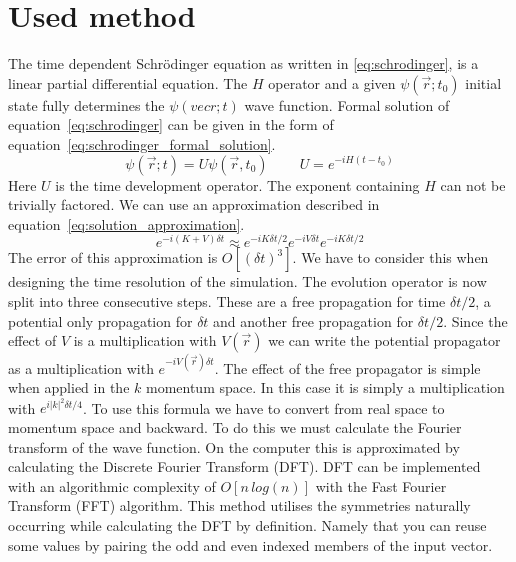 \section{Used method}
\label{sec:used_method}

The time dependent Schrödinger equation as written in \ref{eq:schrodinger}, is a linear partial differential equation.
The $H$ operator and a given $\psi(\vec{r}; t_0)$ initial state fully determines the $\psi(
vec{r}; t)$ wave function.
Formal solution of equation~\ref{eq:schrodinger} can be given in the form of equation~\ref{eq:schrodinger_formal_solution}.
\begin{equation}
	\label{eq:schrodinger_formal_solution}
	\psi(\vec{r}; t) = U\psi(\vec{r}, t_0)\;\;\;\;\;\;\;\; U = e^{-iH(t-t_0)}
\end{equation}
Here $U$ is the time development operator.
The exponent containing $H$ can not be trivially factored.
We can use an approximation described in equation~\ref{eq:solution_approximation}.
\begin{equation}
	\label{eq:solution_approximation}
	e^{-i(K + V)\delta{}t} \approx e^{-iK\delta{}t/2}e^{-iV\delta{}t}e^{-iK\delta{}t/2}
\end{equation}
The error of this approximation is $O\left[(\delta{}t)^3 \right]$.
We have to consider this when designing the time resolution of the simulation.
The evolution operator is now split into three consecutive steps.
These are a free propagation for time $\delta{}t / 2$, a potential only propagation for $\delta{}t$ and another free propagation for $\delta{}t / 2$.
Since the effect of $V$ is a multiplication with $V(\vec{r})$ we can write the potential propagator as a multiplication with $e^{-iV(\vec{r})\delta{}t}$.
The effect of the free propagator is simple when applied in the $k$ momentum space.
In this case it is simply a multiplication with $e^{i|k|^2\delta{}t/4}$.
To use this formula we have to convert from real space to momentum space and backward.
To do this we must calculate the Fourier transform of the wave function.
On the computer this is approximated by calculating the Discrete Fourier Transform (DFT).
DFT can be implemented with an algorithmic complexity of $O\left[n\,log(n)\right]$  with the Fast Fourier Transform (FFT) algorithm.
This method utilises the symmetries naturally occurring while calculating the DFT by definition.
Namely that you can reuse some values by pairing the odd and even indexed members of the input vector.

